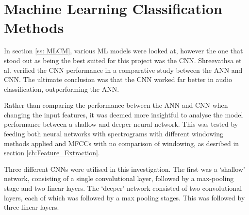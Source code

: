 \documentclass[class=report,11pt,crop=false]{standalone}
\begin{document}
\ifstandalone
\tableofcontents
\fi
\section{Machine Learning Classification Methods \label{ch:ML_Methods}}




In section \ref{ss: MLCM}, various ML models were looked at, however the one that stood out as being the best suited for this project was the CNN. Shreevathsa et al. verified the CNN performance in a comparative study between the ANN and CNN. The ultimate conclusion was that the CNN worked far better in audio classification, outperforming the ANN. 

Rather than comparing the performance between the ANN and CNN when changing the input features, it was deemed more insightful to analyse the model performance between a shallow and deeper neural network. This was tested by feeding both neural networks with spectrograms with different windowing methods applied and MFCCs with no comparison of windowing, as desribed in section \ref{ch:Feature_Extraction}. 

Three different CNNs were utilised in this investigation. The first was a `shallow' network, consisting of a single convolutional layer, followed by a max-pooling stage and two linear layers. The `deeper' network consisted of two convolutional layers, each of which was followed by a max pooling stages. This was followed by three linear layers. 
\end{document}
